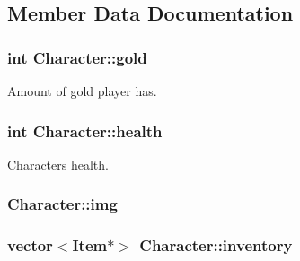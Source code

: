 \subsection{Member Data Documentation}
\hypertarget{classCharacter_ab8dd866071dba429a35555e0c372e162}{
\subsubsection[{gold}]{\setlength{\rightskip}{0pt plus 5cm}int Character\-::gold\hspace{0.3cm}{\ttfamily [protected]}}}\label{classCharacter_ab8dd866071dba429a35555e0c372e162}


Amount of gold player has. 

\hypertarget{classCharacter_a69c649b8febd22729e6edafb27e69aeb}{
\subsubsection[{health}]{\setlength{\rightskip}{0pt plus 5cm}int Character\-::health\hspace{0.3cm}{\ttfamily [protected]}}}\label{classCharacter_a69c649b8febd22729e6edafb27e69aeb}


Characters health. 

\hypertarget{classCharacter_a3a0a90b2a43858b259912f659b8e0eea}{
\subsubsection[{img}]{ Character\-::img\hspace{0.3cm}{\ttfamily [protected]}}}\label{classCharacter_a3a0a90b2a43858b259912f659b8e0eea}
\hypertarget{classCharacter_ade4db4a453cc96bedbf3a385a10291fa}{
\subsubsection[{inventory}]{\setlength{\rightskip}{0pt plus 5cm}vector$<${\bf Item}$\ast$$>$ Character\-::inventory\hspace{0.3cm}{\ttfamily [protected]}}}\label{classCharacter_ade4db4a453cc96bedbf3a385a10291fa}



